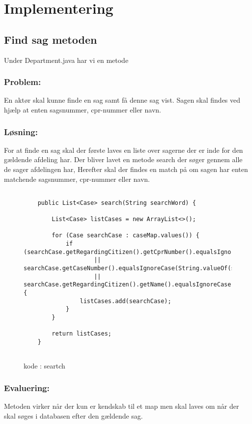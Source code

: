 \section{Implementering}



\subsection{Find sag metoden}
Under Department.java har vi en metode 
\subsubsection{Problem: }
En aktør skal kunne finde en sag samt få denne sag vist. Sagen skal findes ved hjælp at enten sagsnummer, cpr-nummer eller navn. 
\subsubsection{Løsning: }
For at finde en sag skal der første laves en liste over sagerne der er inde for den gældende afdeling har. 
Der bliver lavet en metode search der søger gennem alle de sager afdelingen har,
Herefter skal der findes en match på om sagen har enten matchende sagsnummer, cpr-nummer eller navn. 
\begin{figure}[h]
\begin{lstlisting}

    public List<Case> search(String searchWord) {

        List<Case> listCases = new ArrayList<>();

        for (Case searchCase : caseMap.values()) {
            if (searchCase.getRegardingCitizen().getCprNumber().equalsIgnoreCase(searchWord)
                    || searchCase.getCaseNumber().equalsIgnoreCase(String.valueOf(searchWord))
                    || searchCase.getRegardingCitizen().getName().equalsIgnoreCase(searchWord)) {
                listCases.add(searchCase);
            }
        }

        return listCases;
    }


\end{lstlisting}
\caption{kode : seartch}
\label{kode:Search}
\end{figure}


\subsubsection{Evaluering:}
Metoden virker når der kun er kendskab til et map men skal laves om når der skal søges i databasen efter den gældende sag.